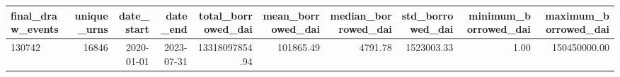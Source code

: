 \begin{tabular}{lrrrrrrrrr}
\toprule
final\_draw\_events & unique\_urns & date\_start & date\_end & total\_borrowed\_dai & mean\_borrowed\_dai & median\_borrowed\_dai & std\_borrowed\_dai & minimum\_borrowed\_dai & maximum\_borrowed\_dai \\
\midrule
130742 & 16846 & 2020-01-01 & 2023-07-31 & 13318097854.94 & 101865.49 & 4791.78 & 1523003.33 & 1.00 & 150450000.00 \\
\bottomrule
\end{tabular}
